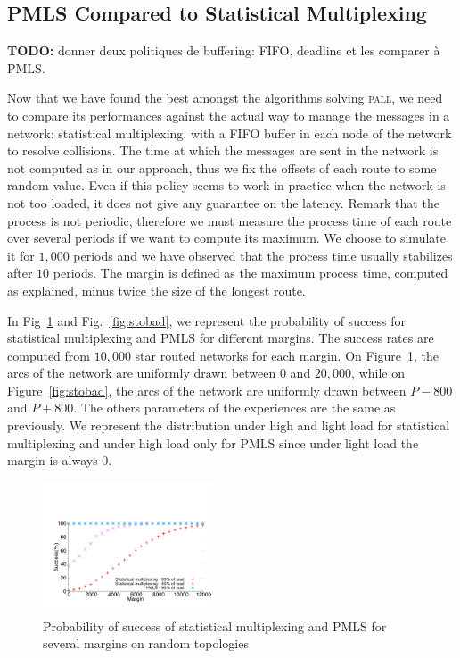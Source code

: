 \documentclass[a4paper,10pt]{article}
\newcommand\pall{\textsc{pall}\xspace}
\begin{document}
     \subsection{PMLS Compared to Statistical Multiplexing}

     \textbf{TODO:} donner deux politiques de buffering: FIFO, deadline et les comparer à PMLS.


     Now that we have found the best amongst the algorithms solving \pall, we need to compare its performances against the actual way to manage the messages in a network:  statistical multiplexing, with a FIFO buffer in each node of the network to resolve collisions. The time at which the messages are sent in the network is not computed as in our approach, thus we fix the offsets of each route to some random value.
     Even if this policy seems to work in practice when the network is not too loaded, it does not give any guarantee on the latency. Remark that the process is not periodic, therefore we must measure the process time of each route over several periods if we want to compute its maximum. We choose to simulate it for $1,000$ periods and we have observed that the process time usually stabilizes after $10$ periods. The margin is defined as the maximum process time, computed as explained, minus twice the size of the longest route. 
	    
     In Fig~\ref{fig:sto} and Fig.~\ref{fig:stobad}, we represent the probability of success for 
     statistical multiplexing and PMLS for different margins. The success rates are computed from $10,000$ star routed networks for each margin. On Figure~\ref{fig:sto}, the arcs of the network are uniformly drawn between $0$ and $20,000$, while on Figure~\ref{fig:stobad}, the arcs of the network are uniformly drawn between $P-800$ and $P+800$. The others parameters of the experiences are the same as previously. We represent the distribution under high and light load for statistical multiplexing and under high load only for PMLS since under light load the margin is always $0$. 
     

    \begin{figure}
       \begin{center}
      \includegraphics[width = 0.45\textwidth]{stochastic.pdf}
      \end{center}
      \caption{Probability of success of statistical multiplexing and PMLS for several margins on random topologies}
      \label{fig:sto}   
     \end{figure}    
     
\end{document}
